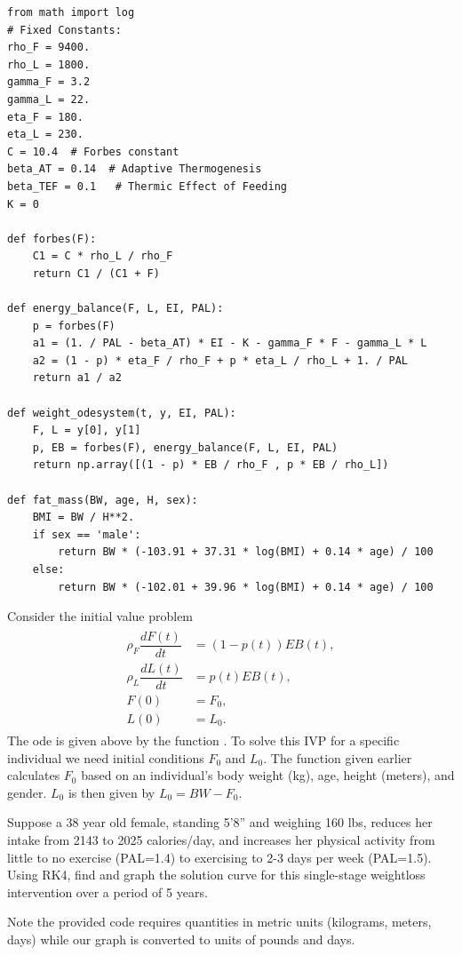 \begin{lstlisting}
from math import log
# Fixed Constants:
rho_F = 9400.
rho_L = 1800.
gamma_F = 3.2
gamma_L = 22.
eta_F = 180.
eta_L = 230.
C = 10.4  # Forbes constant
beta_AT = 0.14  # Adaptive Thermogenesis
beta_TEF = 0.1   # Thermic Effect of Feeding
K = 0

def forbes(F):
    C1 = C * rho_L / rho_F
    return C1 / (C1 + F)

def energy_balance(F, L, EI, PAL):
    p = forbes(F)
    a1 = (1. / PAL - beta_AT) * EI - K - gamma_F * F - gamma_L * L
    a2 = (1 - p) * eta_F / rho_F + p * eta_L / rho_L + 1. / PAL
    return a1 / a2

def weight_odesystem(t, y, EI, PAL):
    F, L = y[0], y[1]
    p, EB = forbes(F), energy_balance(F, L, EI, PAL)
    return np.array([(1 - p) * EB / rho_F , p * EB / rho_L])

def fat_mass(BW, age, H, sex):
    BMI = BW / H**2.
    if sex == 'male':
        return BW * (-103.91 + 37.31 * log(BMI) + 0.14 * age) / 100
    else:
        return BW * (-102.01 + 39.96 * log(BMI) + 0.14 * age) / 100

\end{lstlisting}

\begin{problem}
Consider the initial value problem
\begin{align}
	\begin{split}
\rho_F \dfrac{dF(t)}{dt} &= (1-p(t)) EB(t),\\
\rho_L \dfrac{dL(t)}{dt} &= p(t) EB(t),\\
F(0) &= F_0, \\
L(0) &= L_0.
	\end{split}\label{eqn:weight_prob1}
\end{align}
The ode is given above by the function .
To solve this IVP for a specific individual we need initial conditions $F_0$ and $L_0.$
The function  given earlier calculates $F_0$ based on an individual's body weight (kg), age, height (meters), and gender.
$L_0$ is then given by $L_0 = BW - F_0$.

Suppose a 38 year old female, standing 5'8'' and weighing 160 lbs, reduces her intake from 2143 to 2025 calories/day, and increases her physical activity from little to no exercise (PAL=1.4) to exercising to 2-3 days per week (PAL=1.5).
Using RK4, find and graph the solution curve for this single-stage weightloss intervention over a period of 5 years.

Note the provided code requires quantities in metric units (kilograms, meters, days) while our graph is converted to units of pounds and days.
\end{problem}

